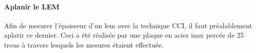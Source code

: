                 \paragraph{Aplanir le LEM}
                    
                    Afin de mesurer l'épaisseur d'un \gls{lem} avec la technique CCI, il faut préalablement aplatir ce dernier. Ceci a été réalisée par une plaque en acier inox percée de 25 trous à travers lesquels les mesures étaient effectuée. 
                    
                    
                    
                    
